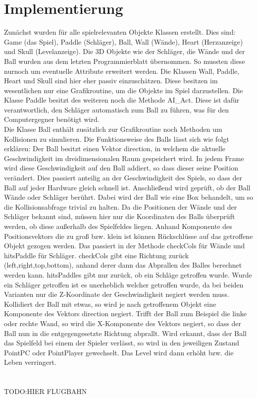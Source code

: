 \section{Implementierung}
Zunächst wurden für alle spielrelevanten Objekte Klassen erstellt. Dies sind: Game (das Spiel), Paddle (Schläger), Ball, Wall (Wände), Heart (Herzanzeige) und Skull (Levelanzeige). Die 3D Objekte wie der Schläger, die Wände und der Ball wurden aus dem letzten Programmierblatt übernommen. So mussten diese nurnoch um eventuelle Attribute erweitert werden. Die Klassen Wall, Paddle, Heart und Skull sind hier eher passiv einzuschätzen. Diese besitzen im wesentlichen nur eine Grafikroutine, um die Objekte im Spiel darzustellen. Die Klasse Paddle besitzt des weiteren noch die Methode AI\_Act. Diese ist dafür verantwortlich, den Schläger automatisch zum Ball zu führen, was für den Computergegner benötigt wird.\\
Die Klasse Ball enthält zusätzlich zur Grafikroutine noch Methoden um Kollisionen zu simulieren. Die Funktionsweise des Balls lässt sich wie folgt erklären: Der Ball besitzt einen Vektor direction, in welchem die aktuelle Geschwindigkeit im dreidimensionalen Raum gespeichert wird. In jedem Frame wird diese Geschwindigkeit auf den Ball addiert, so dass dieser seine Position verändert. Dies passiert anteilig an der Geschwindigkeit des Spiels, so dass der Ball auf jeder Hardware gleich schnell ist. Anschließend wird geprüft, ob der Ball Wände oder Schläger berührt. Dabei wird der Ball wie eine Box behandelt, um so die Kollisionsabfrage trivial zu halten. Da die Positionen der Wände und der Schläger bekannt sind, müssen hier nur die Koordinaten des Balls überprüft werden, ob diese außerhalb des Spielfeldes liegen. Anhand Komponente des Positionsvektors die zu groß bzw. klein ist können Rückschlüsse auf das getroffene Objekt gezogen werden. Das passiert in der Methode checkCols für Wände und hitsPaddle für Schläger. checkCols gibt eine Richtung zurück (left,right,top,bottom), anhand derer dann das Abprallen des Balles berechnet werden kann. hitsPaddles gibt nur zurück, ob ein Schläge getroffen wurde. Wurde ein Schläger getroffen ist es unerheblich welcher getroffen wurde, da bei beiden Varianten nur die Z-Koordinate der Geschwindigkeit negiert werden muss. Kollidiert der Ball mit etwas, so wird je nach getroffenem Objekt eine Komponente des Vektors direction negiert. Trifft der Ball zum Beispiel die linke oder rechte Wand, so wird die X-Komponente des Vektors negiert, so dass der Ball nun in die entgegengesetzte Richtung abprallt. Wird erkannt, dass der Ball das Spielfeld bei einem der Spieler verlässt, so wird in den jeweiligen Zustand PointPC oder PointPlayer gewechselt. Das Level wird dann erhöht bzw. die Leben verringert.\\
\\\\
TODO:HIER FLUGBAHN\\\\

